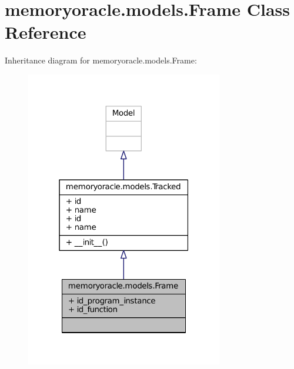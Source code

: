 \hypertarget{classmemoryoracle_1_1models_1_1Frame}{}\section{memoryoracle.\+models.\+Frame Class Reference}
\label{classmemoryoracle_1_1models_1_1Frame}


Inheritance diagram for memoryoracle.\+models.\+Frame\+:
\nopagebreak
\begin{figure}[H]
\begin{center}
\leavevmode
\includegraphics[width=244pt]{classmemoryoracle_1_1models_1_1Frame__inherit__graph}
\end{center}
\end{figure}


